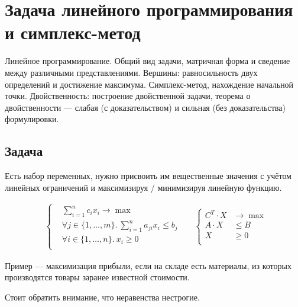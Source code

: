 \section{Задача линейного программирования и симплекс-метод}
Линейное программирование.
Общий вид задачи, матричная форма и
сведение между различными представлениями.
Вершины: равносильность двух определений и достижение максимума.
Симплекс-метод, нахождение начальной точки.
Двойственность: построение двойственной
задачи, теорема о двойственности --- слабая (с доказательством)
и сильная (без доказательства) формулировки.

\subsection{Задача}
Есть набор переменных, нужно присвоить им вещественные значения
с учётом линейных ограничений
и максимизируя / минимизируя линейную функцию.

\begin{align*}
    &
    \left\{
    \begin{aligned}
        & \sum_{i=1}^n c_i x_i \to \max \\
        & \forall j \in \{1, \ldots, m\}.~\sum_{i=1}^n a_{ji} x_i \le b_j \\
        & \forall i \in \{1, \ldots, n\}.~x_i \ge 0 \\
    \end{aligned}
    \right.
    &&
    \left\{
    \begin{aligned}
        C^T \cdot X & \to \max \\
        A \cdot X & \le B \\
        X & \ge 0 \\
    \end{aligned}
    \right.
\end{align*}

Пример --- максимизация прибыли,
если на складе есть материалы,
из которых производятся товары
заранее известной стоимости.

Стоит обратить внимание, что неравенства нестрогие.

